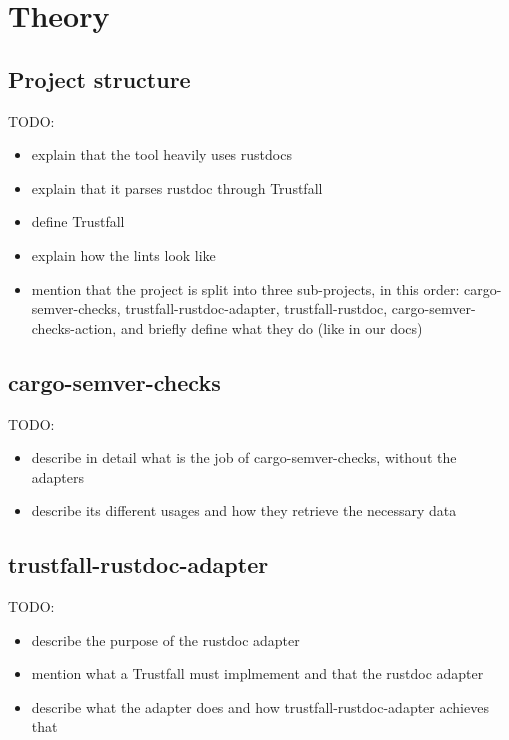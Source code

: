 \documentclass[licencjacka,en]{pracamgr}
\begin{document}
\chapter{Theory}\label{r:chapter_theory}

\section{Project structure}\label{r:section_projectstructure}

TODO:
\begin{itemize}
	\item explain that the tool heavily uses rustdocs
	\item explain that it parses rustdoc through Trustfall
	\item define Trustfall
	\item explain how the lints look like
	\item mention that the project is split into three sub-projects,
		in this order: cargo-semver-checks, trustfall-rustdoc-adapter, trustfall-rustdoc,
		cargo-semver-checks-action,
		and briefly define what they do (like in our docs)
\end{itemize}

\section{cargo-semver-checks}

TODO:
\begin{itemize}
	\item describe in detail what is the job of cargo-semver-checks, without the adapters
	\item describe its different usages and how they retrieve the necessary data
\end{itemize}

\section{trustfall-rustdoc-adapter}

TODO:
\begin{itemize}
	\item describe the purpose of the rustdoc adapter
	\item mention what a Trustfall must implmement and that the rustdoc adapter
	\item describe what the adapter does and how trustfall-rustdoc-adapter achieves that
\end{itemize}
\end{document}
